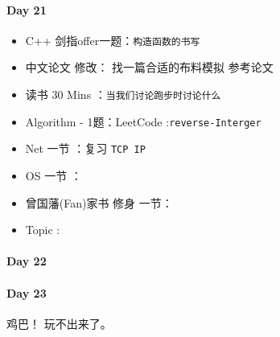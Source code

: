 \documentclass[UTF8,a4paper,8pt]{ctexart}
\begin{document}
 	 \paragraph{Day 21      \quad     }
 	 
	 	 \begin{itemize}[itemindent = 1em]
	 	 	\renewcommand\labelitemi{\makebox[0pt][l]{$\square$}\hspace{1em}} 
	 	 	\renewcommand\labelitemi{\makebox[0pt][l]{$\square$}\raisebox{.15ex}{\hspace{0.1em}$\checkmark$}}	 	
	 	 	\item   C++ 剑指offer一题：\verb|构造函数的书写|
	 	 	\item   中文论文 修改： 找一篇合适的布料模拟 参考论文
	 	 	
	 	 	\item   读书  30 Mins	：\verb|当我们讨论跑步时讨论什么|
	 	 	\item   Algorithm - 1题：LeetCode :\verb|reverse-Interger|	
	 	 	\item   Net 一节 ：复习 \verb|TCP IP|	
	 	 	\renewcommand\labelitemi{\makebox[0pt][l]{$\square$}\hspace{1em}} 
	 	 	
	 	 	\item   OS  一节 ：
	 	 	
	 	 	\renewcommand\labelitemi{\makebox[0pt][l]{$\square$}\raisebox{.15ex}{\hspace{0.1em}$\checkmark$}}
	 	 	\item   曾国藩(Fan)家书 修身 一节：
	 	 	\item   Topic : 
	 	 \end{itemize}
 	 \paragraph{Day 22      \quad     }
 	 \paragraph{Day 23      \quad     }
	 	 鸡巴！ 玩不出来了。
	 	 
\end{document}
